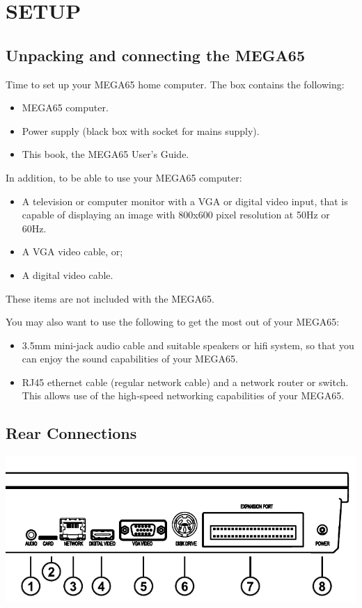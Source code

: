 \chapter{SETUP}
\section{Unpacking and connecting the MEGA65}

Time to set up your MEGA65 home computer.
The box contains the following:
\begin{itemize}
\setlength\itemsep{-0.75mm}
\item MEGA65 computer.
\item Power supply (black box with socket for mains supply).
\item This book, the MEGA65 User's Guide.
\end{itemize}

In addition, to be able to use your MEGA65 computer:
\begin{itemize}
\item A television or computer monitor with a VGA or digital video input, that is capable of displaying an image with 800x600 pixel resolution at 50Hz or 60Hz.
\item A VGA video cable, or;
\item A digital video cable.
\end{itemize}

These items are not included with the MEGA65.

You may also want to use the following to get the most out of your MEGA65:
\begin{itemize}
\item 3.5mm mini-jack audio cable and suitable speakers or hifi system, so that you can enjoy the sound capabilities of your MEGA65.
\item RJ45 ethernet cable (regular network cable) and a network router or switch. This allows use of the high-speed networking capabilities of your MEGA65.
\end{itemize}

\section{Rear Connections}

\includegraphics[width=\linewidth]{images/illustrations/mega65-rear.pdf}

